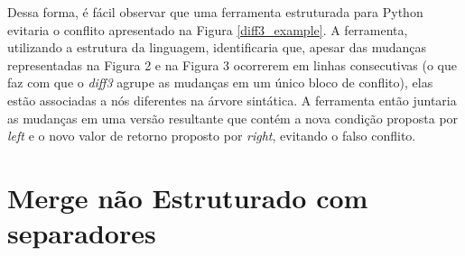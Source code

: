 Dessa forma, é fácil observar que uma ferramenta estruturada para Python evitaria o
conflito apresentado na Figura \ref{diff3_example}. A ferramenta, utilizando a estrutura da
linguagem, identificaria que, apesar das mudanças representadas na Figura 2 e na
Figura 3 ocorrerem em linhas consecutivas (o que faz com que o \emph{diff3} agrupe as mudanças em um único bloco de conflito),
elas estão associadas a nós diferentes na árvore
sintática. A ferramenta então juntaria as mudanças em uma versão resultante que contém a
nova condição proposta por \emph{left} e o novo valor de retorno proposto por \emph{right},
evitando o falso conflito.

\section{Merge não Estruturado com separadores}



